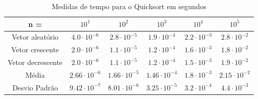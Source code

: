 \documentclass{article}
\begin{document}
\begin{table}[h]
    \begin{tabular}{c|c|c|c|c|c}
        n = & $10^{1}$ & $10^{2}$ & $10^{3}$ & $10^{4}$ & $10^{5}$ \\ 
        \hline
        Vetor aleatório & $4.0\cdot 10^{-6}$ & $2.8\cdot 10^{-5}$ & $1.9\cdot 10^{-4}$ & $2.2\cdot 10^{-3}$ & $2.8\cdot 10^{-2}$ \\
        \hline
        Vetor crescente & $2.0\cdot 10^{-6}$ & $1.1\cdot 10^{-5}$ & $1.2\cdot 10^{-4}$ & $1.6\cdot 10^{-3}$ & $1.8\cdot 10^{-2}$\\
        \hline
        Vetor decrescente & $2.0\cdot10^{-6}$ & $1.1\cdot 10^{-5}$ & $1.2\cdot 10^{-4}$ & $1.5\cdot 10^{-3}$ & $1.9\cdot 10^{-2}$\\
        \hline
        Média & $2.66\cdot 10^{-6}$ & $1.66\cdot 10^{-5}$ & $1.46\cdot10^{-4}$ & $1.8\cdot 10^{-3}$ & $2.15\cdot 10^{-2}$ \\
        \hline
        Desvio Padrão & $9.42\cdot 10^{-7}$ & $8.01\cdot 10^{-6}$ & $3.25\cdot 10^{-5}$ & $3.2\cdot 10^{-4}$ & $4.4\cdot 10^{-3}$ \\
    \end{tabular}
    \caption{Medidas de tempo para o Quicksort em segundos}
\end{table} \par
%
\end{document}
